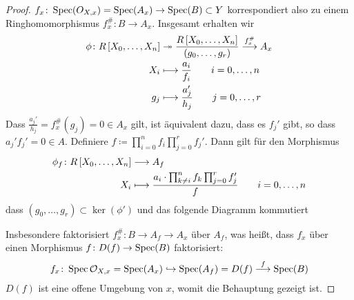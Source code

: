 \documentclass[german]{scrreprt}
\begin{document}
\begin{Lemma}
\begin{proof}
    $f_x\colon\operatorname{Spec}(O_{X,x})=\operatorname{Spec}(A_x)\to\operatorname{Spec}(B)\subset Y$
    korrespondiert also zu einem Ringhomomorphismus $f_x^\#\colon B\to
    A_x$.
    Insgesamt erhalten wir
    \begin{align*}
        \phi\colon
        R\left[X_0,\dotsc, X_n\right]
        &\twoheadrightarrow
        \dfrac{R\left[X_0,\dotsc, X_n\right]}{\left(g_0,\dotsc, g_r\right)}
        \overset{f_x^\#}{\longrightarrow}
        A_x\\
        X_i &\longmapsto \frac{a_i}{f_i}
        \qquad i=0,\dotsc, n\\
        g_j &\longmapsto \frac{a_j'}{h_j}
        \qquad j=0,\dotsc, r
    \end{align*}
    Dass $\frac{a_j'}{h_j}=f_x^\#(g_j)=0\in A_x$ gilt, ist äquivalent
    dazu, dass es $f_j'$ gibt, so dass $a_j' f_j'=0\in A$.
    Definiere $f\coloneqq \prod_{i=0}^n f_i \prod_{j=0}^r f_j'$.
    Dann gilt für den Morphismus
    \begin{align*}
      \phi_f\colon
      R\left[X_0,\dotsc, X_n\right]
      &\longrightarrow
        A_f\\
      X_i
      &\longmapsto
        \dfrac{a_i\cdot \prod_{k\neq i}^n f_k \prod_{j=0}^r f_j'}{f}
        \qquad i=0,\dotsc,n
    \end{align*}
    dass $(g_0, \dotsc, g_r)\subset\ker(\phi')$ und das folgende
    Diagramm kommutiert
    \begin{center}
    \end{center}
    Insbesondere faktorisiert $f_x^\#\colon B\to A_f\to A_x$ über
    $A_f$, was heißt, dass $f_x$ über einen Morphismus $f\colon
    D(f)\to\operatorname{Spec}(B)$ faktorisiert:
    \begin{gather*}
      f_x\colon
      \operatorname{Spec}\mathcal{O}_{X,x}=\operatorname{Spec}(A_x)
      \hookrightarrow \operatorname{Spec}(A_f)=D(f)
      \overset{f}{\longrightarrow} \operatorname{Spec}(B)
    \end{gather*}
    $D(f)$ ist eine offene Umgebung von $x$, womit die Behauptung
    gezeigt ist.
  \end{proof}
\end{Lemma}
\end{document}
